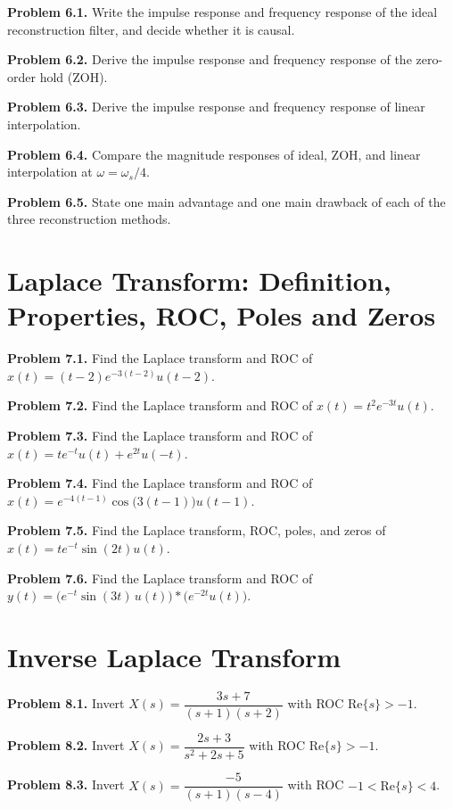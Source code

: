 \documentclass[10pt]{article}
\newcommand{\QuestionItem}[2]{\par\medskip\textbf{#1.} #2\par}
\begin{document}
\QuestionItem{Problem 6.1}{Write the impulse response and frequency response of the ideal reconstruction filter, and decide whether it is causal.}

\QuestionItem{Problem 6.2}{Derive the impulse response and frequency response of the zero-order hold (ZOH).}

\QuestionItem{Problem 6.3}{Derive the impulse response and frequency response of linear interpolation.}

\QuestionItem{Problem 6.4}{Compare the magnitude responses of ideal, ZOH, and linear interpolation at \(\omega=\omega_s/4\).}

\QuestionItem{Problem 6.5}{State one main advantage and one main drawback of each of the three reconstruction methods.}

\section{Laplace Transform: Definition, Properties, ROC, Poles and Zeros}

\QuestionItem{Problem 7.1}{Find the Laplace transform and ROC of \(x(t)=(t-2)e^{-3(t-2)}u(t-2)\).}

\QuestionItem{Problem 7.2}{Find the Laplace transform and ROC of \(x(t)=t^2 e^{-3t}u(t)\).}

\QuestionItem{Problem 7.3}{Find the Laplace transform and ROC of \(x(t)=t e^{-t}u(t)+e^{2t}u(-t)\).}

\QuestionItem{Problem 7.4}{Find the Laplace transform and ROC of \(x(t)=e^{-4(t-1)}\cos\!\bigl(3(t-1)\bigr)u(t-1)\).}

\QuestionItem{Problem 7.5}{Find the Laplace transform, ROC, poles, and zeros of \(x(t)=t e^{-t}\sin(2t)u(t)\).}

\QuestionItem{Problem 7.6}{Find the Laplace transform and ROC of \(y(t)=\bigl(e^{-t}\sin(3t)\,u(t)\bigr)*\bigl(e^{-2t}u(t)\bigr)\).}

\section{Inverse Laplace Transform}

\QuestionItem{Problem 8.1}{Invert \(X(s)=\dfrac{3s+7}{(s+1)(s+2)}\) with ROC \(\text{Re}\{s\}>-1\).}

\QuestionItem{Problem 8.2}{Invert \(X(s)=\dfrac{2s+3}{s^2+2s+5}\) with ROC \(\text{Re}\{s\}>-1\).}

\QuestionItem{Problem 8.3}{Invert \(X(s)=\dfrac{-5}{(s+1)(s-4)}\) with ROC \(-1<\text{Re}\{s\}<4\).}
\end{document}
